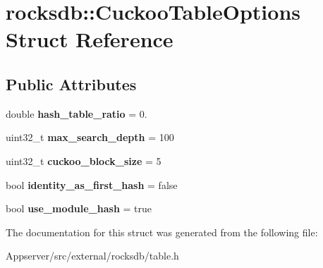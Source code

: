 \hypertarget{structrocksdb_1_1CuckooTableOptions}{}\section{rocksdb\+:\+:Cuckoo\+Table\+Options Struct Reference}
\label{structrocksdb_1_1CuckooTableOptions}
\subsection*{Public Attributes}
\begin{DoxyCompactItemize}
\item 
double {\bfseries hash\+\_\+table\+\_\+ratio} = 0.\hypertarget{structrocksdb_1_1CuckooTableOptions_a63a45d534a355a9f630032188e3abe52}{}\label{structrocksdb_1_1CuckooTableOptions_a63a45d534a355a9f630032188e3abe52}

\item 
uint32\+\_\+t {\bfseries max\+\_\+search\+\_\+depth} = 100\hypertarget{structrocksdb_1_1CuckooTableOptions_a679f19302046a5036e00a6b0327fde64}{}\label{structrocksdb_1_1CuckooTableOptions_a679f19302046a5036e00a6b0327fde64}

\item 
uint32\+\_\+t {\bfseries cuckoo\+\_\+block\+\_\+size} = 5\hypertarget{structrocksdb_1_1CuckooTableOptions_a1652482a3f24a4996d3f0e3c58c0c420}{}\label{structrocksdb_1_1CuckooTableOptions_a1652482a3f24a4996d3f0e3c58c0c420}

\item 
bool {\bfseries identity\+\_\+as\+\_\+first\+\_\+hash} = false\hypertarget{structrocksdb_1_1CuckooTableOptions_a4f2e21b88e5c6386088bd5a84a4335dc}{}\label{structrocksdb_1_1CuckooTableOptions_a4f2e21b88e5c6386088bd5a84a4335dc}

\item 
bool {\bfseries use\+\_\+module\+\_\+hash} = true\hypertarget{structrocksdb_1_1CuckooTableOptions_a8122b5e1c72fc71b8675957609674cbc}{}\label{structrocksdb_1_1CuckooTableOptions_a8122b5e1c72fc71b8675957609674cbc}

\end{DoxyCompactItemize}


The documentation for this struct was generated from the following file\+:\begin{DoxyCompactItemize}
\item 
Appserver/src/external/rocksdb/table.\+h\end{DoxyCompactItemize}
